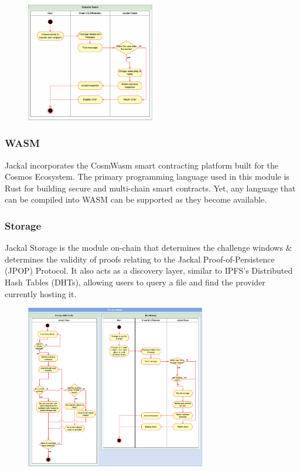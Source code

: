 \documentclass[a4paper]{article}
\begin{document}
\begin{figure}[!htbp]
\centering
\includegraphics[width=0.5\textwidth]{assets/rns7.png}
\end{figure}

\newpage
\subsubsection{WASM}
Jackal incorporates the CosmWasm \cite{cosmwasm} smart contracting platform built for the Cosmos Ecosystem. The primary programming language used in this module is Rust for building secure and multi-chain smart contracts. Yet, any language that can be compiled into WASM can be supported as they become available. 

\subsubsection{Storage}
Jackal Storage is the module on-chain that determines the challenge windows \& determines the validity of proofs relating to the Jackal Proof-of-Persistence (JPOP) Protocol. It also acts as a discovery layer, similar to IPFS's Distributed Hash Tables (DHTs), allowing users to query a file and find the provider currently hosting it. \cite{dht}
\begin{figure}[!htbp]
\centering
\includegraphics[width=0.7\textwidth]{assets/storage1.png}
\end{figure}
\end{document}
